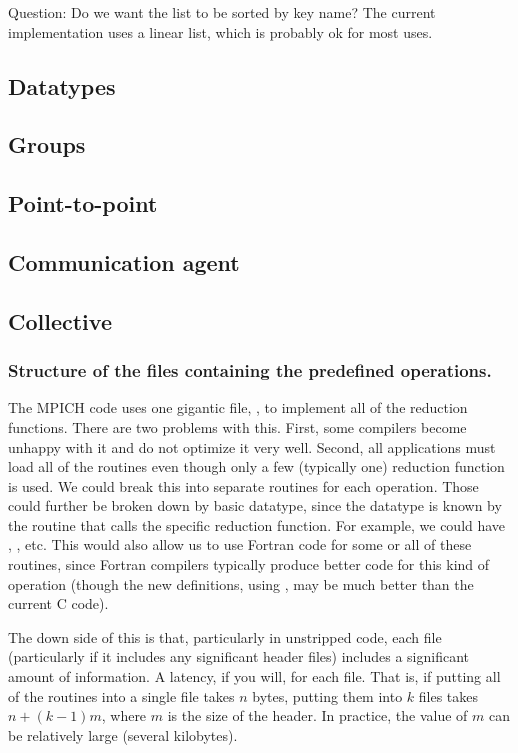 \documentclass{article}
\begin{document}
Question: Do we want the list to be sorted by key name?  The current
implementation uses a linear list, which is probably ok for most uses.
\subsection{Datatypes}
\subsection{Groups}
\subsection{Point-to-point}  
\subsection{Communication agent}
\subsection{Collective}  

\subsubsection{Structure of the files containing the predefined operations.}

The MPICH code uses one gigantic file, , to implement
all of the reduction functions.  There are two problems with this.
First, some compilers become unhappy with it and do not optimize it
very well.  Second, all applications must load all of the routines
even though only a few (typically one) reduction function is used.  We
could break this into separate routines for each operation.  Those
could further be broken down by basic datatype, since the datatype is
known by the routine that calls the specific reduction function.  
For example, we could have ,
, etc.  This would also allow us to use Fortran
code for some or all of these routines, since Fortran compilers
typically produce better code for this kind of operation (though the
new definitions, using , may be much better than the
current C code).

The down side of this is that, particularly in unstripped code, each
file (particularly if it includes any significant header files)
includes a significant amount of information.  A latency, if you will,
for each file.  That is, if putting all of the routines into a single
file takes $n$ bytes, putting them into $k$ files takes $n + (k-1)m$,
where $m$ is the size of the header.  In practice, the value of $m$ can be
relatively large (several kilobytes).
\end{document}
